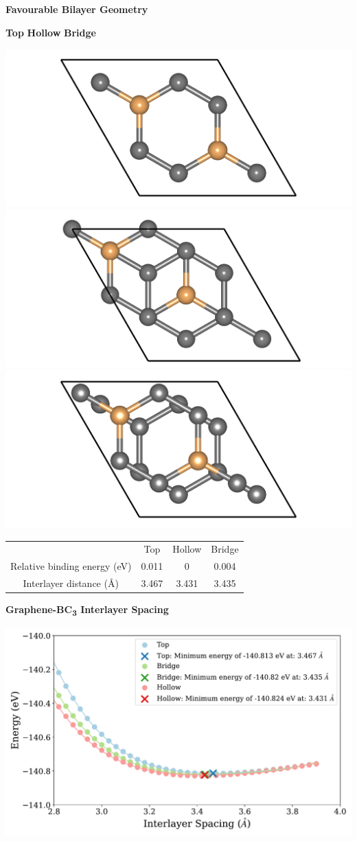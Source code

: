 \documentclass[a0paper,portrait]{baposter}
\begin{document}
\begin{poster}
{\begin{minipage}[t]{0.56\linewidth}\begin{center}
    \small\textbf{Favourable Bilayer Geometry}
    \par \textbf{Top} \qquad\qquad \textbf{Hollow} \qquad\qquad \textbf{Bridge}
    \par\includegraphics[width=0.32\linewidth]{poster_figures/G-BC3_top.png}
    \includegraphics[width=0.32\linewidth]{poster_figures/G-BC3_hollow.png}
    \includegraphics[width=0.32\linewidth]{poster_figures/G-BC3_bridge.png}
    \par
    \footnotesize
    \begin{tabular}{c|c|c|c}
    \rowcolor{table_color_1}\
        & Top & Hollow & Bridge \\
        Relative binding energy (eV) & 0.011 & 0 & 0.004 \\
        Interlayer distance (Å) & 3.467 & 3.431 & 3.435 \\
    \end{tabular}
\end{center}\end{minipage}
\begin{minipage}[t]{0.43\linewidth}\begin{center}
    \small\textbf{Graphene-BC\textsubscript{3} Interlayer Spacing}
    \par\includegraphics[width=0.8\linewidth]{poster_figures/G-BC3_interlayer_spacing.pdf}
\end{center}\end{minipage}

}
\end{poster}
\end{document}
